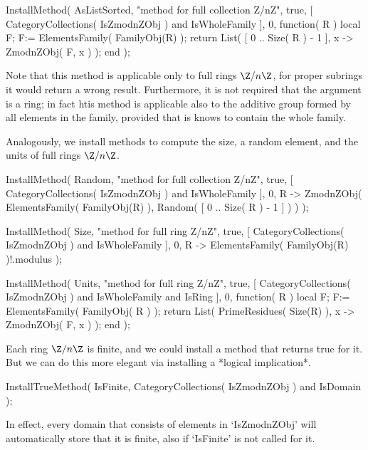 \beginexample
    InstallMethod( AsListSorted,
        "method for full collection Z/nZ",
        true,
        [ CategoryCollections( IsZmodnZObj ) and IsWholeFamily ], 0,
        function( R )
        local F;
        F:= ElementsFamily( FamilyObj(R) );
        return List( [ 0 .. Size( R ) - 1 ], x -> ZmodnZObj( F, x ) );
        end );
\endexample

Note that this method is applicable only to full rings $\Z/n\Z$,
for proper subrings it would return a wrong result.
Furthermore, it is not required that the argument is a ring;
in fact htis method is applicable also to the additive group
formed by all elements in the family,
provided that is knows to contain the whole family.

Analogously, we install methods to compute the size,
a random element, and the units of full rings $\Z/n\Z$.

\beginexample
    InstallMethod( Random,
        "method for full collection Z/nZ",
        true,
        [ CategoryCollections( IsZmodnZObj ) and IsWholeFamily ], 0,
        R -> ZmodnZObj( ElementsFamily( FamilyObj(R) ),
                        Random( [ 0 .. Size( R ) - 1 ] ) ) );

    InstallMethod( Size,
        "method for full ring Z/nZ",
        true,
        [ CategoryCollections( IsZmodnZObj ) and IsWholeFamily ], 0,
        R -> ElementsFamily( FamilyObj(R) )!.modulus );

    InstallMethod( Units,
        "method for full ring Z/nZ",
        true,
        [ CategoryCollections( IsZmodnZObj ) and IsWholeFamily
                                             and IsRing ], 0,
        function( R )
        local F;
        F:= ElementsFamily( FamilyObj( R ) );
        return List( PrimeResidues( Size(R) ), x -> ZmodnZObj( F, x ) );
        end );
\endexample

Each ring $\Z/n\Z$ is finite,
and we could install a method that returns true for it.
But we can do this more elegant via installing a *logical implication*.

\beginexample
    InstallTrueMethod( IsFinite,
        CategoryCollections( IsZmodnZObj ) and IsDomain );
\endexample

In effect, every domain that consists of elements in `IsZmodnZObj'
will automatically store that it is finite,
also if `IsFinite' is not called for it.



